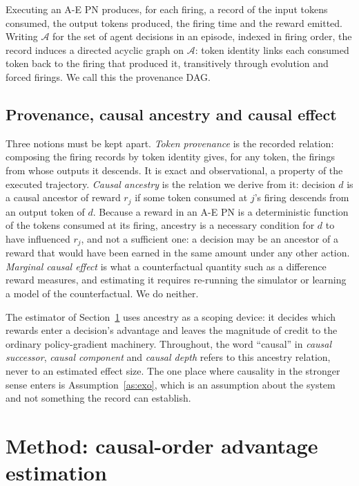 \documentclass[review,authoryear,3p,times]{elsarticle}
\newcommand{\Ascr}{\mathcal{A}}
\begin{document}
Executing an A-E PN produces, for each firing, a record of the input tokens
consumed, the output tokens produced, the firing time and the reward emitted.
Writing $\Ascr$ for the set of agent decisions in an episode, indexed in firing
order, the record induces a directed acyclic graph on $\Ascr$: token identity
links each consumed token back to the firing that produced it, transitively
through evolution and forced firings. We call this the provenance DAG.

\subsection{Provenance, causal ancestry and causal effect}
\label{sec:terms}

Three notions must be kept apart. \emph{Token provenance} is the recorded
relation: composing the firing records by token identity gives, for any token,
the firings from whose outputs it descends. It is exact and observational, a
property of the executed trajectory. \emph{Causal ancestry} is the relation we
derive from it: decision $d$ is a causal ancestor of reward $r_j$ if some token
consumed at $j$'s firing descends from an output token of $d$. Because a reward
in an A-E PN is a deterministic function of the tokens consumed at its firing,
ancestry is a necessary condition for $d$ to have influenced $r_j$, and not a
sufficient one: a decision may be an ancestor of a reward that would have been
earned in the same amount under any other action. \emph{Marginal causal
effect} is what a counterfactual quantity such as a difference reward measures,
and estimating it requires re-running the simulator or learning a model of the
counterfactual. We do neither.

The estimator of Section~\ref{sec:method} uses ancestry as a scoping device: it
decides which rewards enter a decision's advantage and leaves the magnitude of
credit to the ordinary policy-gradient machinery. Throughout, the word
``causal'' in \emph{causal successor}, \emph{causal component} and \emph{causal
depth} refers to this ancestry relation, never to an estimated effect size. The
one place where causality in the stronger sense enters is
Assumption~\ref{as:exo}, which is an assumption about the system and not
something the record can establish.

\section{Method: causal-order advantage estimation}
\label{sec:method}
\end{document}
